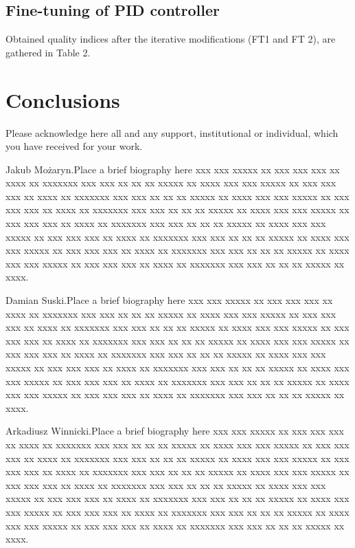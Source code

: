 \documentclass{amcs}
\begin{document}
\subsection{Fine-tuning of PID controller}

Obtained quality indices after the iterative modifications (FT1 and FT 2), are gathered in Table 2.

\section{Conclusions}

\begin{acknowledgment}
Please acknowledge here all and any support, institutional or individual, which you have received for your work.
\end{acknowledgment}



\begin{biography}[photo]{Jakub Mo\.{z}aryn.}Place a brief biography here xxx xxx xxxxx xx xxx xxx xxx xx xxxx xx xxxxxxx xxx xxx xx xx xx xxxxx xx xxxx xxx xxx xxxxx xx xxx xxx xxx xx xxxx xx xxxxxxx xxx xxx xx xx xx xxxxx xx xxxx xxx xxx xxxxx xx xxx xxx xxx xx xxxx xx xxxxxxx xxx xxx xx xx xx xxxxx xx xxxx xxx xxx xxxxx xx xxx xxx xxx xx xxxx xx xxxxxxx xxx xxx xx xx xx xxxxx xx xxxx xxx xxx xxxxx xx xxx xxx xxx xx xxxx xx xxxxxxx xxx xxx xx xx xx xxxxx xx xxxx xxx xxx xxxxx xx xxx xxx xxx xx xxxx xx xxxxxxx xxx xxx xx xx xx xxxxx xx xxxx xxx xxx xxxxx xx xxx xxx xxx xx xxxx xx xxxxxxx xxx xxx xx xx xx xxxxx xx xxxx.
\end{biography}

\begin{biography}[]{Damian Suski.}Place a brief biography here xxx xxx xxxxx xx xxx xxx xxx xx xxxx xx xxxxxxx xxx xxx xx xx xx xxxxx xx xxxx xxx xxx xxxxx xx xxx xxx xxx xx xxxx xx xxxxxxx xxx xxx xx xx xx xxxxx xx xxxx xxx xxx xxxxx xx xxx xxx xxx xx xxxx xx xxxxxxx xxx xxx xx xx xx xxxxx xx xxxx xxx xxx xxxxx xx xxx xxx xxx xx xxxx xx xxxxxxx xxx xxx xx xx xx xxxxx xx xxxx xxx xxx xxxxx xx xxx xxx xxx xx xxxx xx xxxxxxx xxx xxx xx xx xx xxxxx xx xxxx xxx xxx xxxxx xx xxx xxx xxx xx xxxx xx xxxxxxx xxx xxx xx xx xx xxxxx xx xxxx xxx xxx xxxxx xx xxx xxx xxx xx xxxx xx xxxxxxx xxx xxx xx xx xx xxxxx xx xxxx.
\end{biography}

\begin{biography}[]{Arkadiusz Winnicki.}Place a brief biography here xxx xxx xxxxx xx xxx xxx xxx xx xxxx xx xxxxxxx xxx xxx xx xx xx xxxxx xx xxxx xxx xxx xxxxx xx xxx xxx xxx xx xxxx xx xxxxxxx xxx xxx xx xx xx xxxxx xx xxxx xxx xxx xxxxx xx xxx xxx xxx xx xxxx xx xxxxxxx xxx xxx xx xx xx xxxxx xx xxxx xxx xxx xxxxx xx xxx xxx xxx xx xxxx xx xxxxxxx xxx xxx xx xx xx xxxxx xx xxxx xxx xxx xxxxx xx xxx xxx xxx xx xxxx xx xxxxxxx xxx xxx xx xx xx xxxxx xx xxxx xxx xxx xxxxx xx xxx xxx xxx xx xxxx xx xxxxxxx xxx xxx xx xx xx xxxxx xx xxxx xxx xxx xxxxx xx xxx xxx xxx xx xxxx xx xxxxxxx xxx xxx xx xx xx xxxxx xx xxxx.
\end{biography}
\end{document}
